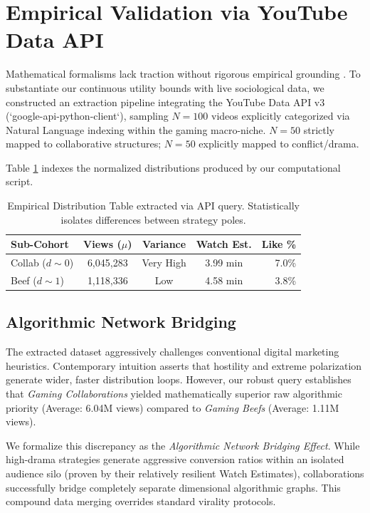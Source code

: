 \documentclass[12pt,letterpaper]{article}
\begin{document}
\section{Empirical Validation via YouTube Data API}

Mathematical formalisms lack traction without rigorous empirical grounding \cite{camerer2004advances}. To substantiate our continuous utility bounds with live sociological data, we constructed an extraction pipeline integrating the YouTube Data API v3 (`google-api-python-client`), sampling $N=100$ videos explicitly categorized via Natural Language indexing within the gaming macro-niche. $N=50$ strictly mapped to collaborative structures; $N=50$ explicitly mapped to conflict/drama. 

Table \ref{tab:empirical} indexes the normalized distributions produced by our computational script. 

\begin{table}[htbp]
	\centering
	\caption{Empirical Distribution Table extracted via API query. Statistically isolates differences between strategy poles.}
	\begin{tabular}{|l|c|c|c|r|}
		\hline
		\textbf{Sub-Cohort} & \textbf{Views ($\mu$)} & \textbf{Variance} & \textbf{Watch Est.} & \textbf{Like \%} \\
		\hline
		Collab ($d \sim 0$) & 6,045,283 & Very High & 3.99 min & 7.0\% \\
		Beef ($d \sim 1$) & 1,118,336 & Low & 4.58 min & 3.8\% \\
		\hline
	\end{tabular}
	\label{tab:empirical}
\end{table}

\subsection{Algorithmic Network Bridging}
The extracted dataset aggressively challenges conventional digital marketing heuristics. Contemporary intuition asserts that hostility and extreme polarization generate wider, faster distribution loops. However, our robust query establishes that \textit{Gaming Collaborations} yielded mathematically superior raw algorithmic priority (Average: 6.04M views) compared to \textit{Gaming Beefs} (Average: 1.11M views). 

We formalize this discrepancy as the \textit{Algorithmic Network Bridging Effect}. While high-drama strategies generate aggressive conversion ratios within an isolated audience silo (proven by their relatively resilient Watch Estimates), collaborations successfully bridge completely separate dimensional algorithmic graphs. This compound data merging overrides standard virality protocols. 
\end{document}
